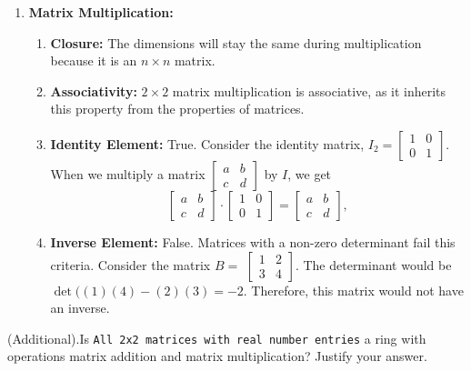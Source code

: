 {\begin{enumerate}
\begin{enumerate}[label=(\arabic*)]
            
        \end{enumerate}
        \item \textbf{Matrix Multiplication:} \xmark
        \begin{enumerate}[label=(\arabic*)]
            \item \textbf{Closure:} The dimensions will stay the same during multiplication because it is an $n \times n$ matrix. 
            \item \textbf{Associativity:} $2 \times 2$ matrix multiplication is associative, as it inherits this property from the properties of matrices.
            \item \textbf{Identity Element:} True. Consider the identity matrix, $I_2 =
            \begin{bmatrix}
                1 & 0 \\
                0 & 1
            \end{bmatrix}$. When we multiply a matrix $\begin{bmatrix}
                a & b \\
                c & d
            \end{bmatrix}$ by $I$, we get $$\begin{bmatrix}
                a & b \\
                c & d
            \end{bmatrix} \cdot
            \begin{bmatrix}
                1 & 0 \\
                0 & 1
            \end{bmatrix} = \begin{bmatrix}
                a & b \\
                c & d
            \end{bmatrix},$$
            \item \textbf{Inverse Element:} False. Matrices with a non-zero determinant fail this criteria. Consider the matrix $B =$
            $\begin{bmatrix}
                1 & 2 \\
                3 & 4 
            \end{bmatrix}$. The determinant would be $\det((1)(4) - (2)(3) = -2$. Therefore, this matrix would not have an inverse. 
        \end{enumerate}
    \end{enumerate}
}

\begin{exercise}
    {(Additional).}Is \texttt{All 2x2 matrices with real number entries} a ring with operations matrix addition and matrix multiplication? Justify your answer.
\end{exercise}

